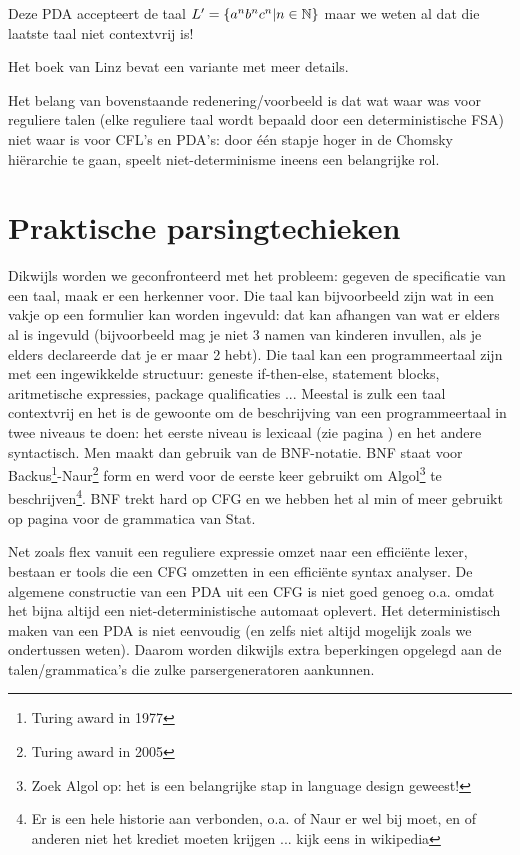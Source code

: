 Deze PDA accepteert de taal $L' = \{a^nb^nc^n|n \in \mathbb{N}\}$ maar we weten al
dat die laatste taal niet contextvrij is!  

Het boek van Linz bevat een variante met meer details.



Het belang van bovenstaande redenering/voorbeeld is dat wat waar was
voor reguliere talen (elke reguliere taal wordt bepaald door een
deterministische FSA) niet waar is voor CFL's en PDA's: door
\'{e}\'{e}n stapje hoger in de Chomsky hi\"erarchie te gaan, speelt
niet-determinisme ineens een belangrijke rol.

\clearpage
\section{Praktische parsingtechieken}

Dikwijls worden we geconfronteerd met het probleem: gegeven de
specificatie van een taal, maak er een herkenner voor.  Die taal kan
bijvoorbeeld zijn wat in een vakje op een formulier kan worden
ingevuld: dat kan afhangen van wat er elders al is ingevuld
(bijvoorbeeld mag je niet 3 namen van kinderen invullen, als je elders
declareerde dat je er maar 2 hebt). Die taal kan een programmeertaal
zijn met een ingewikkelde structuur: geneste if-then-else, statement
blocks, aritmetische expressies, package qualificaties ... Meestal is
zulk een taal contextvrij en het is de gewoonte om de beschrijving van
een programmeertaal in twee niveaus te doen: het eerste niveau is
lexicaal (zie pagina \pageref{flexlabel}) en het andere
syntactisch. Men maakt dan gebruik van de BNF-notatie. BNF staat voor
Backus\footnote{Turing award in 1977}-Naur\footnote{Turing award in
2005} form en werd voor de eerste keer gebruikt om Algol\footnote{Zoek
Algol op: het is een belangrijke stap in language design geweest!} te
beschrijven\footnote{Er is een hele historie aan verbonden, o.a. of
Naur er wel bij moet, en of anderen niet het krediet moeten krijgen
... kijk eens in wikipedia}. BNF trekt hard op CFG en we hebben het al
min of meer gebruikt op pagina \pageref{statlabel} voor de grammatica
van Stat.  

Net zoals flex vanuit een reguliere expressie omzet naar een
effici\"ente lexer, bestaan er tools die een CFG omzetten in een
effici\"ente syntax analyser. De algemene constructie van een PDA uit
een CFG is niet goed genoeg o.a. omdat het bijna altijd een
niet-deterministische automaat oplevert. Het deterministisch maken van
een PDA is niet eenvoudig (en zelfs niet altijd mogelijk zoals we
ondertussen weten). Daarom worden dikwijls extra beperkingen opgelegd
aan de talen/grammatica's die zulke parsergeneratoren aankunnen.  

